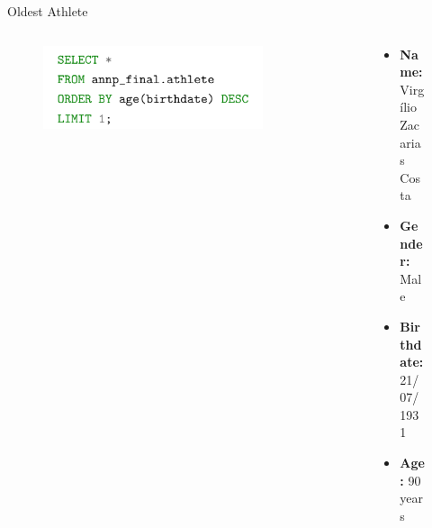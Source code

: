 \documentclass[aspectratio=169, xcolor=dvipsnames]{beamer}
\begin{document}
\begin{frame}{Oldest Athlete}
\begin{columns}[c]
\begin{column}{.5\textwidth}
\begin{figure}
    \centering
    \includegraphics[width=0.9\textwidth]{img/sql/oldest.png}
\end{figure}
\end{column}

\begin{column}{.5\textwidth}
\begin{figure}
\begin{itemize}
    \item \textbf{Name:} Virgílio Zacarias Costa
    \item \textbf{Gender:} Male
    \item \textbf{Birthdate:} 21/07/1931
    \item \textbf{Age:} 90 years
\end{itemize}
\end{figure}
\end{column}
\end{columns}
\end{frame}
\end{document}
